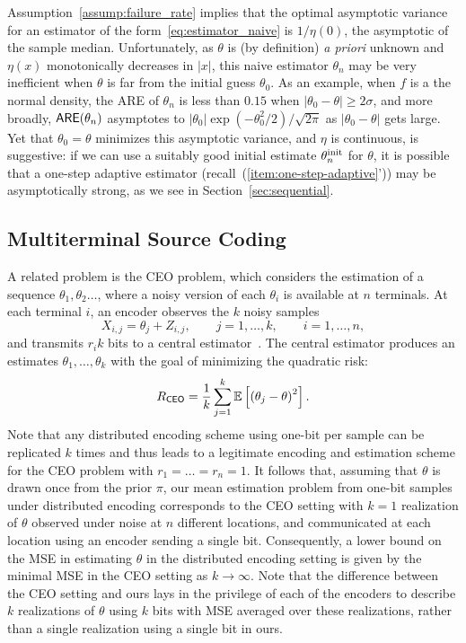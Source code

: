 Assumption~\ref{assump:failure_rate} implies that the optimal asymptotic
variance for an estimator of the form~\eqref{eq:estimator_naive} is $1 /
\eta(0)$, the asymptotic of the sample median. Unfortunately, as $\theta$ is
(by definition) \emph{a priori} unknown and $\eta(x)$ monotonically
decreases in $|x|$, this naive estimator $\theta_n$ may be very inefficient
when $\theta$ is far from the initial guess $\theta_0$. As an example, when
$f$ is a the normal density, the ARE of ${\theta}_n$ is less than $0.15$
when $|\theta_0 - \theta| \ge 2\sigma$, and more broadly, $\mathsf{ARE}(\theta_n)$
asymptotes to $|\theta_0| \exp(-\theta_0^2 / 2) / \sqrt{2\pi}$ as $|\theta_0
- \theta|$ gets large.  Yet that $\theta_0 = \theta$ minimizes this
asymptotic variance, and $\eta$ is continuous, is suggestive: if we can use
a suitably good initial estimate $\theta_n^{\textup{init}}$ for $\theta$, it is
possible that a one-step adaptive estimator
(recall~(\ref{item:one-step-adaptive}')) may be asymptotically strong, as we
see in Section~\ref{sec:sequential}.

\subsection{Multiterminal Source Coding}
\label{sec:ceo}

A related problem is the CEO problem, which considers the estimation of a
sequence $\theta_1,\theta_2\ldots$, where a noisy version of each $\theta_i$
is available at $n$ terminals. At each terminal $i$, an encoder observes the
$k$ noisy samples
\[
X_{i,j} = \theta_j + Z_{i,j},\qquad j=1,\ldots,k, \qquad i = 1,\ldots,n,
\]
and transmits $r_i k$ bits to a central estimator~\cite{berger1996ceo}. The
central estimator produces an estimates ${\theta}_1,\ldots,{\theta}_k$ with
the goal of minimizing the quadratic risk:
\[
R_{\mathsf{CEO}} = \frac{1}{k} \sum_{j=1}^k \mathbb E \left[\left(\theta_j - {\theta} \right)^2 \right]. 
\]
Note that any distributed encoding scheme using one-bit per sample can be replicated $k$ times and thus leads to a legitimate encoding and estimation scheme for the CEO problem with $r_1=\ldots=r_n = 1$. It follows that, assuming that $\theta$ is drawn once from the prior $\pi$, our mean estimation problem from one-bit samples under distributed encoding corresponds to the CEO setting with $k=1$ realization of $\theta$ observed under noise at $n$ different locations, and communicated at each location using an encoder sending a single bit. 
%
Consequently, a lower bound on the MSE in estimating $\theta$ in the
distributed encoding setting is given by the minimal MSE in the CEO setting
as $k \to \infty$. Note that the difference between the CEO setting and ours
lays in the privilege of each of the encoders to describe $k$ realizations
of $\theta$ using $k$ bits with MSE averaged over these realizations, rather
than a single realization using a single bit in ours.

